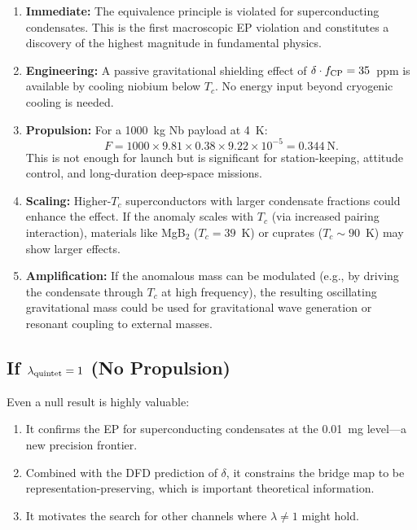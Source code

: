 \documentclass[12pt,a4paper]{article}
\theoremstyle{definition}
\theoremstyle{remark}
\begin{document}
\begin{enumerate}
\item \textbf{Immediate:} The equivalence principle is violated for
superconducting condensates.  This is the first macroscopic EP violation and
constitutes a discovery of the highest magnitude in fundamental physics.

\item \textbf{Engineering:} A passive gravitational shielding effect of
$\delta \cdot f_{\rm CP} = 35$~ppm is available by cooling niobium below $T_c$.
No energy input beyond cryogenic cooling is needed.

\item \textbf{Propulsion:} For a 1000~kg Nb payload at 4~K:
\begin{equation}
F = 1000 \times 9.81 \times 0.38 \times 9.22 \times 10^{-5} = 0.344~\text{N}.
\end{equation}
This is not enough for launch but is significant for station-keeping,
attitude control, and long-duration deep-space missions.

\item \textbf{Scaling:} Higher-$T_c$ superconductors with larger condensate
fractions could enhance the effect.  If the anomaly scales with $T_c$ (via
increased pairing interaction), materials like MgB$_2$ ($T_c = 39$~K) or
cuprates ($T_c \sim 90$~K) may show larger effects.

\item \textbf{Amplification:} If the anomalous mass can be modulated
(e.g., by driving the condensate through $T_c$ at high frequency), the
resulting oscillating gravitational mass could be used for gravitational
wave generation or resonant coupling to external masses.
\end{enumerate}

\subsection{If $\lambda_{\rm quintet} = 1$ (No Propulsion)}

Even a null result is highly valuable:

\begin{enumerate}
\item It confirms the EP for superconducting condensates at the 0.01~mg level---a
new precision frontier.
\item Combined with the DFD prediction of $\delta$, it constrains the bridge
map to be representation-preserving, which is important theoretical information.
\item It motivates the search for other channels where $\lambda \neq 1$ might hold.
\end{enumerate}
\end{document}
